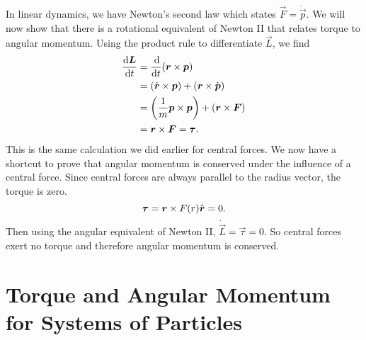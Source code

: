 \documentclass[../classical_mechanics.tex]{subfiles}
\begin{document}
        \paragraph{}
        In linear dynamics, we have Newton's second law which states $\vec{F}=\dot{\vec{p}}$.
        We will now show that there is a rotational equivalent of Newton II that relates torque to angular momentum.
        Using the product rule to differentiate $\vec{L}$, we find
        \begin{align}
            \dv{\vec{L}}{t}&=\dv{}{t}(\vec{r}\times\vec{p})\\
            &=(\dot{\vec{r}}\times\vec{p})+(\vec{r}\times\dot{\vec{p}})\\
            &=\left(\frac{1}{m}\vec{p}\times\vec{p}\right)+(\vec{r}\times\vec{F})\\
            &=\vec{r}\times\vec{F}=\vec{\tau}.
        \end{align}
        This is the same calculation we did earlier for central forces.
        We now have a shortcut to prove that angular momentum is conserved under the influence of a central force.
        Since central forces are always parallel to the radius vector, the torque is zero.
        \begin{equation}
            \boldsymbol{\tau}=\boldsymbol{r}\times F(r)\hat{\boldsymbol{r}}=0.
        \end{equation}
        Then using the angular equivalent of Newton II, $\dot{\vec{L}}=\vec{\tau}=0$.
        So central forces exert no torque and therefore angular momentum is conserved.

    \section{Torque and Angular Momentum for Systems of Particles}
\end{document}
